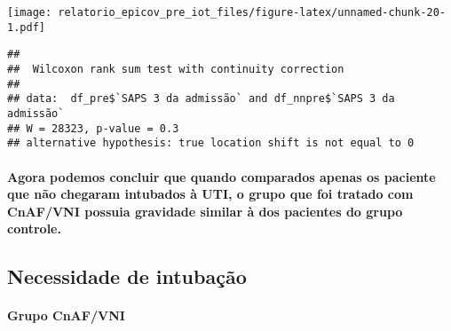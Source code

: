 \documentclass[
]{article}
\newenvironment{Shaded}{\begin{snugshade}}{\end{snugshade}}
\newcommand{\AttributeTok}[1]{\textcolor[rgb]{0.77,0.63,0.00}{#1}}
\newcommand{\FunctionTok}[1]{\textcolor[rgb]{0.00,0.00,0.00}{#1}}
\newcommand{\NormalTok}[1]{#1}
\newcommand{\SpecialCharTok}[1]{\textcolor[rgb]{0.00,0.00,0.00}{#1}}
\newcommand{\StringTok}[1]{\textcolor[rgb]{0.31,0.60,0.02}{#1}}
\begin{document}
\texttt{[image: relatorio\_epicov\_pre\_iot\_files/figure-latex/unnamed-chunk-20-1.pdf]}

\begin{Shaded}
\end{Shaded}

\begin{verbatim}
## 
##  Wilcoxon rank sum test with continuity correction
## 
## data:  df_pre$`SAPS 3 da admissão` and df_nnpre$`SAPS 3 da admissão`
## W = 28323, p-value = 0.3
## alternative hypothesis: true location shift is not equal to 0
\end{verbatim}

\hypertarget{agora-podemos-concluir-que-quando-comparados-apenas-os-paciente-que-nuxe3o-chegaram-intubados-uxe0-uti-o-grupo-que-foi-tratado-com-cnafvni-possuia-gravidade-similar-uxe0-dos-pacientes-do-grupo-controle.}{%
\paragraph{Agora podemos concluir que quando comparados apenas os
paciente que não chegaram intubados à UTI, o grupo que foi tratado com
CnAF/VNI possuia gravidade similar à dos pacientes do grupo
controle.}\label{agora-podemos-concluir-que-quando-comparados-apenas-os-paciente-que-nuxe3o-chegaram-intubados-uxe0-uti-o-grupo-que-foi-tratado-com-cnafvni-possuia-gravidade-similar-uxe0-dos-pacientes-do-grupo-controle.}}

\hypertarget{necessidade-de-intubauxe7uxe3o}{%
\subsection{\texorpdfstring{\textbf{Necessidade de
intubação}}{Necessidade de intubação}}\label{necessidade-de-intubauxe7uxe3o}}

\hypertarget{grupo-cnafvni-4}{%
\paragraph{\texorpdfstring{\textbf{Grupo
CnAF/VNI}}{Grupo CnAF/VNI}}\label{grupo-cnafvni-4}}
\end{document}

